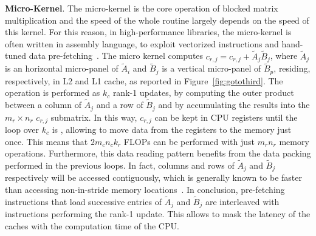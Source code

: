 \noindent \textbf{Micro-Kernel}. The micro-kernel is the core operation of blocked matrix multiplication and the speed of the whole routine largely depends on the speed of this kernel. For this reason, in high-performance libraries, the micro-kernel is often written in assembly language, to exploit vectorized instructions and hand-tuned data pre-fetching~\cite{van2015blis}.
The micro kernel computes $c_{r,j} = c_{r,j} + \tilde{A}_j \tilde{B}_j$, where $\tilde{A}_j$ is an horizontal micro-panel of $\tilde{A}_i$ and $\tilde{B}_j$ is a vertical micro-panel of $\tilde{B}_p$, residing, respectively, in L2 and L1 cache, as reported in Figure~\ref{fig:gotothird}. The operation is performed as $k_c$ rank-1 updates, by computing the outer product between a column of  $\tilde{A}_j$ and a row of $\tilde{B}_j$ and by accumulating the results into the $m_r \times n_r$ $c_{r,j}$ submatrix. In this way, $c_{r,j}$ can be kept in CPU registers until the loop over $k_c$ is , allowing to move data from the registers to the memory just once. This means that $2m_c n_c k_r$ FLOPs can be performed with just $m_r n_r$ memory operations. Furthermore, this data reading pattern benefits from the data packing performed in the previous loops. In fact, columns and rows of $\tilde{A}_j$ and $\tilde{B}_j$ respectively will be accessed contiguously, which is generally known to be faster than accessing non-in-stride memory locations~\cite{low2016analytical}. In conclusion, pre-fetching instructions that load successive entries of $\tilde{A}_j$ and $\tilde{B}_j$ are interleaved with instructions performing the rank-1 update. This allows to mask the latency of the caches with the computation time of the CPU.


